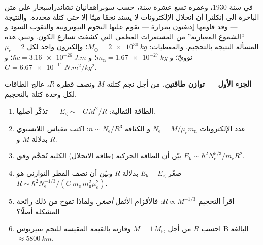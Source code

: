 \begin{problem}\label{pb:b3:quantum-statistics:1}
في سنة 1930، وعمره تسع عشرة سنة، حسب سوبراهمانيان تشاندراسيخار على
متن الباخرة إلى إنكلترا أن انحلال الإلكترونات لا يسند نجمًا ميتًا
إلا حتى كتلة محددة. والنتيجة --- وقد قاومها إدنغتون
بمرارة --- تقوم عليها النجوم النيوترونية والثقوب السود و
``الشموع المعيارية'' من المستعرات العظمى التي كشفت تسارع
الكون. وتبني هذه المسألة النتيجة بالتحجيم. والمعطيات: $M_\odot =
\qty{2e30}{kg}$؛ وإلكترون واحد لكل $\mu_e = 2$ نوويّ؛ و $m_{\text{
n}} = \qty{1.67e-27}{kg}$؛ و $\hbar c = \qty{3.16e-26}{J.m}$؛ و $G =
\qty{6.67e-11}{N.m^2/kg^2}$.

\medskip\noindent\textbf{الجزء الأول --- توازن طاقتين.}
من أجل نجم كتلته $M$ ونصف قطره $R$، عالج الطاقات لكل وحدة
كتلة بالتحجيم.
\begin{enumerate}
  \item الطاقة الثقالية: $E_{\text{g}} \sim -GM^2/R$ ---
        تذكّر أصلها.
  \item عدد الإلكترونات $N_{\text{e}} = M/\mu_e m_{\text{n}}$ و
        الكثافة $n \sim N_{\text{e}}/R^3$: اكتب مقياس
         اللانسبوي بدلالة $M$
        و $R$.
  \item بيّن أن الطاقة الحركية (طاقة الانحلال) الكلية تُحجَّم وفق
        $E_{\text{k}} \sim \hbar^2N_{\text{e}}^{5/3}/m_{\text{e}}
        R^2$.
  \item صغّر $E_{\text{k}} + E_{\text{g}}$ بدلالة $R$ وبيّن أن
        نصف القطر التوازني هو
        $R \sim \hbar^2 N_{\text{e}}^{-1/3}/(G\,m_{\text{e}}\,
        m_{\text{n}}^2\mu_e^2)$.
  \item اقرأ التحجيم $R \propto M^{-1/3}$: فالأقزام الأثقل
        \emph{أصغر}. ولماذا تفوح من ذلك رائحة
        المشكلة أصلًا؟
  \item احسب $R$ من أجل $M = 1\,M_\odot$ وقارنه بالقيمة المقيسة
        للنجم سيريوس B البالغة $\approx\qty{5800}{km}$.
\end{enumerate}


\end{problem}
